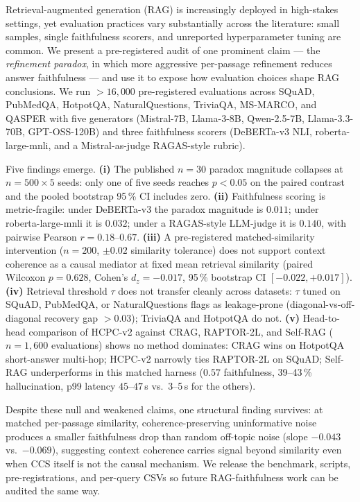 Retrieval-augmented generation (RAG) is increasingly deployed in
high-stakes settings, yet evaluation practices vary substantially
across the literature: small samples, single faithfulness scorers,
and unreported hyperparameter tuning are common. We present a
pre-registered audit of one prominent claim --- the \emph{refinement
paradox}, in which more aggressive per-passage refinement reduces
answer faithfulness --- and use it to expose how
evaluation choices shape RAG conclusions.
We run \(>16{,}000\) pre-registered evaluations across SQuAD,
PubMedQA, HotpotQA, NaturalQuestions, TriviaQA, MS-MARCO, and QASPER
with five generators (Mistral-7B, Llama-3-8B, Qwen-2.5-7B,
Llama-3.3-70B, GPT-OSS-120B) and three faithfulness scorers
(DeBERTa-v3 NLI, roberta-large-mnli, and a Mistral-as-judge
RAGAS-style rubric).

Five findings emerge.
\textbf{(i)} The published \(n{=}30\) paradox magnitude collapses at
\(n{=}500{\times}5\) seeds: only one of five seeds reaches
\(p<0.05\) on the paired contrast and the pooled bootstrap 95\,\% CI
includes zero.
\textbf{(ii)} Faithfulness scoring is metric-fragile: under
DeBERTa-v3 the paradox magnitude is \(0.011\); under roberta-large-mnli
it is \(0.032\); under a RAGAS-style LLM-judge it is \(0.140\),
with pairwise Pearson \(r=0.18\)--\(0.67\).
\textbf{(iii)} A pre-registered matched-similarity intervention
(\(n{=}200\), \(\pm 0.02\) similarity tolerance) does not support
context coherence as a causal mediator at fixed mean retrieval
similarity (paired Wilcoxon \(p=0.628\), Cohen's \(d_z=-0.017\),
95\,\% bootstrap CI \([-0.022,+0.017]\)).
\textbf{(iv)} Retrieval threshold \(\tau\) does not transfer cleanly
across datasets: \(\tau\) tuned on SQuAD, PubMedQA, or NaturalQuestions
flags as leakage-prone (diagonal-vs-off-diagonal recovery gap \(>0.03\));
TriviaQA and HotpotQA do not.
\textbf{(v)} Head-to-head comparison of HCPC-v2 against CRAG, RAPTOR-2L,
and Self-RAG (\(n{=}1{,}600\) evaluations) shows no method dominates:
CRAG wins on HotpotQA short-answer multi-hop;
HCPC-v2 narrowly ties RAPTOR-2L on SQuAD;
Self-RAG underperforms in this matched harness
(\(0.57\) faithfulness, 39--43\,\% hallucination, p99 latency
\(45\)--\(47\)\,s vs.\ 3--5\,s for the others).

Despite these null and weakened claims, one structural finding
survives: at matched per-passage similarity, coherence-preserving
uninformative noise produces a smaller faithfulness drop than random
off-topic noise (slope \(-0.043\) vs.\ \(-0.069\)), suggesting
context coherence carries signal beyond similarity even when CCS
itself is not the causal mechanism.
We release the benchmark, scripts, pre-registrations, and per-query
CSVs so future RAG-faithfulness work can be audited the same way.

